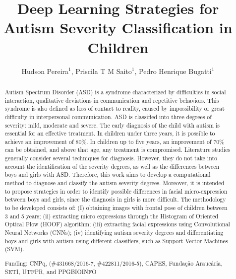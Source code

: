 \documentclass[twoside]{article}
\title{\vspace{-15mm}\fontsize{24pt}{10pt}\selectfont\textbf{Deep Learning Strategies for Autism Severity Classification in Children}} %
\author{Hudson Pereira$^1$, Priscila T M Saito$^1$, Pedro Henrique Bugatti$^1$}
\affil{1 FEDERAL UNIVERSITY OF TECHNOLOGY\\ }
\date{}
\begin{document}
\maketitle %

\thispagestyle{fancy} %


\begin{abstract}
Autism Spectrum Disorder (ASD) is a syndrome characterized by difficulties in social interaction, qualitative deviations in communication and repetitive behaviors. This syndrome is also defined as loss of contact to reality, caused by impossibility or great difficulty in interpersonal communication. ASD is classified into three degrees of severity: mild, moderate and severe. The early diagnosis of the child with autism is essential for an effective treatment. In children under three years, it is possible to achieve an improvement of 80\%. In children up to five years, an improvement of 70\% can be obtained, and above that age, any treatment is compromised. Literature studies generally consider several techniques for diagnosis. However, they do not take into account the identification of the severity degrees, as well as the differences between boys and girls with ASD. Therefore, this work aims to develop a computational method to diagnose and classify the autism severity degrees. Moreover, it is intended to propose strategies in order to identify possible differences in facial micro-expression between boys and girls, since the diagnosis in girls is more difficult. The methodology to be developed consists of: (I) obtaining images with frontal pose of children between 3 and 5 years; (ii) extracting micro expressions through the Histogram of Oriented Optical Flow (HOOF) algorithm; (iii) extracting facial expressions using Convolutional Neural Networks (CNNs); (iv) identifying autism severity degrees and differentiating boys and girls with autism using different classifiers, such as Support Vector Machines (SVM).

Funding: CNPq,  (\#431668/2016-7, \#422811/2016-5), CAPES, Funda\c{c}\~ao Arauc\'aria, SETI, UTFPR, and PPGBIOINFO
\end{abstract}
\end{document}
